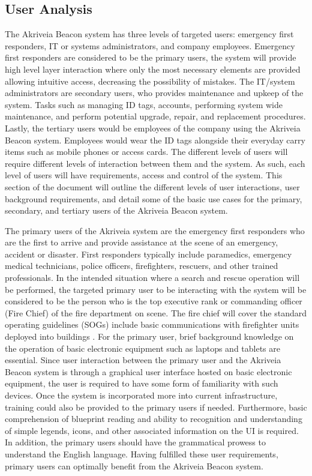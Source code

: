 

\subsection{User Analysis}
\medskip
The Akriveia Beacon system has three levels of targeted users: emergency first responders, IT or systems administrators, and company employees. Emergency first responders are considered to be the primary users, the system will provide high level layer interaction where only the most necessary elements are provided allowing intuitive access, decreasing the possibility of mistakes. The IT/system administrators are secondary users, who provides maintenance and upkeep of the system. Tasks such as managing ID tags, accounts, performing system wide maintenance, and perform potential upgrade, repair, and replacement procedures. Lastly, the tertiary users would be employees of the company using the Akriveia Beacon system. Employees would wear the ID tags alongside their everyday carry items such as mobile phones or access cards. The different levels of users will require different levels of interaction between them and the system. As such, each level of users will have requirements, access and control of the system. This section of the document will outline the different levels of user interactions, user background requirements, and detail some of the basic use cases for the primary, secondary, and tertiary users of the Akriveia Beacon system.

\bigskip
The primary users of the Akriveia system are the emergency first responders who are the first to arrive and provide assistance at the scene of an emergency, accident or disaster. First responders typically include paramedics, emergency medical technicians, police officers, firefighters, rescuers, and other trained professionals. In the intended situation where a search and rescue operation will be performed, the targeted primary user to be interacting with the system will be considered to be the person who is the top executive rank or commanding officer (Fire Chief) of the fire department on scene. The fire chief will cover the standard operating guidelines (SOGs) include basic communications with firefighter units deployed into buildings \cite{R10-2-1}. For the primary user, brief background knowledge on the operation of basic electronic equipment such as laptops and tablets are essential. Since user interaction between the primary user and the Akriveia Beacon system is through a graphical user interface hosted on basic electronic equipment, the user is required to have some form of familiarity with such devices. Once the system is incorporated more into current infrastructure, training could also be provided to the primary users if needed. Furthermore, basic comprehension of blueprint reading and ability to recognition and understanding of simple legends, icons, and other associated information on the UI is required. In addition, the primary users should have the grammatical prowess to understand the English language. Having fulfilled these user requirements, primary users can optimally benefit from the Akriveia Beacon system.

